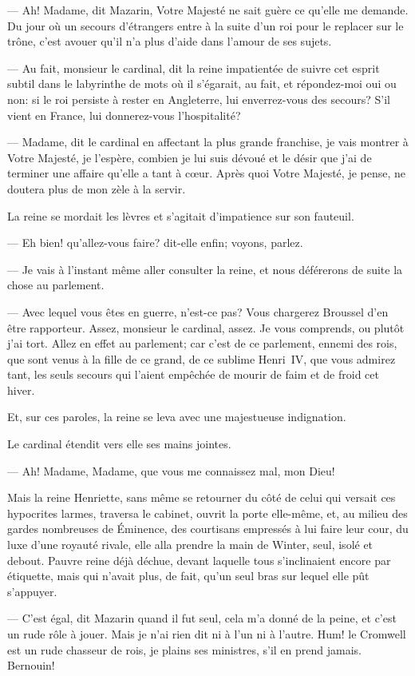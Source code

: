 — Ah! Madame, dit Mazarin, Votre Majesté ne sait guère ce qu'elle me demande. Du jour où un secours d'étrangers entre à la suite d'un roi pour le replacer sur le trône, c'est avouer qu'il n'a plus d'aide dans l'amour de ses sujets.

— Au fait, monsieur le cardinal, dit la reine impatientée de suivre cet esprit subtil dans le labyrinthe de mots où il s'égarait, au fait, et répondez-moi oui ou non: si le roi persiste à rester en Angleterre, lui enverrez-vous des secours? S'il vient en France, lui donnerez-vous l'hospitalité?

— Madame, dit le cardinal en affectant la plus grande franchise, je vais montrer à Votre Majesté, je l'espère, combien je lui suis dévoué et le désir que j'ai de terminer une affaire qu'elle a tant à cœur. Après quoi Votre Majesté, je pense, ne doutera plus de mon zèle à la servir.

La reine se mordait les lèvres et s'agitait d'impatience sur son fauteuil.

— Eh bien! qu'allez-vous faire? dit-elle enfin; voyons, parlez.

— Je vais à l'instant même aller consulter la reine, et nous déférerons de suite la chose au parlement.

— Avec lequel vous êtes en guerre, n'est-ce pas? Vous chargerez Broussel d'en être rapporteur. Assez, monsieur le cardinal, assez. Je vous comprends, ou plutôt j'ai tort. Allez en effet au parlement; car c'est de ce parlement, ennemi des rois, que sont venus à la fille de ce grand, de ce sublime Henri~IV, que vous admirez tant, les seuls secours qui l'aient empêchée de mourir de faim et de froid cet hiver.

Et, sur ces paroles, la reine se leva avec une majestueuse indignation.

Le cardinal étendit vers elle ses mains jointes.

— Ah! Madame, Madame, que vous me connaissez mal, mon Dieu!

Mais la reine Henriette, sans même se retourner du côté de celui qui versait ces hypocrites larmes, traversa le cabinet, ouvrit la porte elle-même, et, au milieu des gardes nombreuses de Éminence, des courtisans empressés à lui faire leur cour, du luxe d'une royauté rivale, elle alla prendre la main de Winter, seul, isolé et debout. Pauvre reine déjà déchue, devant laquelle tous s'inclinaient encore par étiquette, mais qui n'avait plus, de fait, qu'un seul bras sur lequel elle pût s'appuyer.

— C'est égal, dit Mazarin quand il fut seul, cela m'a donné de la peine, et c'est un rude rôle à jouer. Mais je n'ai rien dit ni à l'un ni à l'autre. Hum! le Cromwell est un rude chasseur de rois, je plains ses ministres, s'il en prend jamais. Bernouin!

